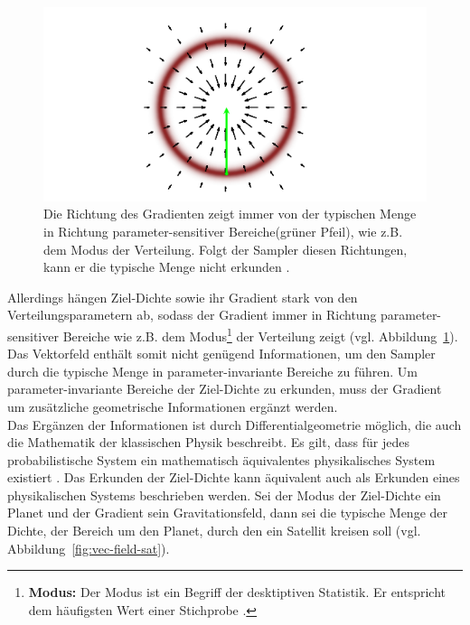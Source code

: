 \documentclass[ngerman]{ttlab-qualify}
\begin{document}
\begin{figure}[H]
\begin{center}
\includegraphics[scale=.9]{images/vector-field-grad-betancourt-2017}
\caption{Die Richtung des Gradienten zeigt immer von der typischen Menge in Richtung parameter-sensitiver Bereiche(grüner Pfeil), wie z.B. dem Modus der Verteilung. Folgt der Sampler diesen Richtungen, kann er die typische Menge nicht erkunden \parencite{betancourt:2017}.}
\label{fig:vec-field-grad}
\end{center}
\end{figure}

Allerdings hängen Ziel-Dichte sowie ihr Gradient stark von den Verteilungsparametern ab, sodass der Gradient immer in Richtung parameter-sensitiver Bereiche wie z.B. dem Modus\footnote{\textbf{Modus:} Der Modus ist ein Begriff der desktiptiven Statistik. Er entspricht dem häufigsten Wert einer Stichprobe \parencite{modus}.} der Verteilung zeigt (vgl. Abbildung~\ref{fig:vec-field-grad}).
Das Vektorfeld enthält somit nicht genügend Informationen, um den Sampler durch die typische Menge in parameter-invariante Bereiche zu führen. Um parameter-invariante Bereiche der Ziel-Dichte zu erkunden, muss der Gradient um zusätzliche geometrische Informationen ergänzt werden. \\

Das Ergänzen der Informationen ist durch Differentialgeometrie möglich, die auch die Mathematik der klassischen Physik beschreibt. Es gilt, dass für jedes probabilistische System ein mathematisch äquivalentes physikalisches System existiert \parencite{betancourt:2017}.
Das Erkunden der Ziel-Dichte kann äquivalent auch als Erkunden eines physikalischen Systems beschrieben werden. Sei der Modus der Ziel-Dichte ein Planet und der Gradient sein Gravitationsfeld, dann sei die typische Menge der Dichte, der Bereich um den Planet, durch den ein Satellit kreisen soll (vgl. Abbildung~\ref{fig:vec-field-sat}). \\
\end{document}
